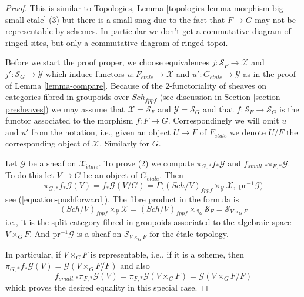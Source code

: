 \documentclass{stacks-project}
\theoremstyle{plain}
\theoremstyle{definition}
\theoremstyle{remark}
\numberwithin{equation}{subsection}
\def\Sch{\mathit{Sch}}
\def\etale{{\acute{e}tale}}
\begin{document}
\begin{proof}
This is similar to
Topologies, Lemma \ref{topologies-lemma-morphism-big-small-etale} (3)
but there is a small snag due to the fact that $F \to G$ may not be
representable by schemes. In particular we don't get a commutative diagram
of ringed sites, but only a commutative diagram of ringed topoi.

\medskip\noindent
Before we start the proof proper, we choose equivalences
$j : \mathcal{S}_F \to \mathcal{X}$ and
$j' : \mathcal{S}_G \to \mathcal{Y}$ which induce functors
$u : F_\etale \to \mathcal{X}$ and
$u' : G_\etale \to \mathcal{Y}$ as in the proof of
Lemma \ref{lemma-compare}. Because of the 2-functoriality of
sheaves on categories fibred in groupoids over $\Sch_{fppf}$
(see discussion in Section \ref{section-presheaves})
we may assume that $\mathcal{X} = \mathcal{S}_F$ and
$\mathcal{Y} = \mathcal{S}_G$ and that $f : \mathcal{S}_F \to \mathcal{S}_G$
is the functor associated to the morphism $f : F \to G$. Correspondingly
we will omit $u$ and $u'$ from the notation, i.e., given an object
$U \to F$ of $F_\etale$ we denote $U/F$
the corresponding object of $\mathcal{X}$. Similarly for $G$.

\medskip\noindent
Let $\mathcal{G}$ be a sheaf on $\mathcal{X}_\etale$.
To prove (2) we compute $\pi_{G, *}f_*\mathcal{G}$ and
$f_{small, *}\pi_{F, *}\mathcal{G}$. To do this let $V \to G$ be an object
of $G_\etale$. Then
$$
\pi_{G, *}f_*\mathcal{G}(V) = f_*\mathcal{G}(V/G) =
\Gamma\Big(
(\Sch/V)_{fppf} \times_{\mathcal{Y}} \mathcal{X},
\ \text{pr}^{-1}\mathcal{G}\Big)
$$
see (\ref{equation-pushforward}). The fibre product in the formula is
$$
(\Sch/V)_{fppf} \times_{\mathcal{Y}} \mathcal{X} =
(\Sch/V)_{fppf} \times_{\mathcal{S}_G} \mathcal{S}_F =
\mathcal{S}_{V \times_G F}
$$
i.e., it is the split category fibred in groupoids associated to the
algebraic space $V \times_G F$. And $\text{pr}^{-1}\mathcal{G}$ is a
sheaf on $\mathcal{S}_{V \times_G F}$ for the \'etale topology.

\medskip\noindent
In particular, if $V \times_G F$ is representable, i.e., if it is a scheme,
then $\pi_{G, *}f_*\mathcal{G}(V) = \mathcal{G}(V \times_G F/F)$ and
also
$$
f_{small, *}\pi_{F, *}\mathcal{G}(V) =
\pi_{F, *}\mathcal{G}(V \times_G F) =
\mathcal{G}(V \times_G F/F)
$$
which proves the desired equality in this special case.


\end{proof}
\end{document}
